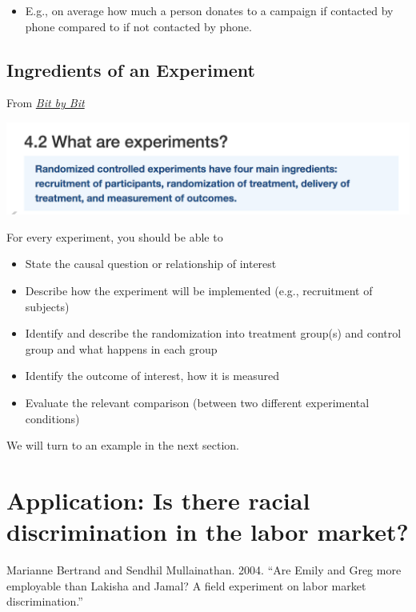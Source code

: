 \documentclass[
  letterpaper,
  DIV=11,
  numbers=noendperiod]{scrreprt}
\providecommand{\tightlist}{%
  \setlength{\itemsep}{0pt}\setlength{\parskip}{0pt}}\usepackage{longtable,booktabs,array}
\begin{document}
\begin{itemize}
\tightlist
\item
  E.g., on average how much a person donates to a campaign if contacted
  by phone compared to if not contacted by phone.
\end{itemize}

\hypertarget{ingredients-of-an-experiment}{%
\subsection{Ingredients of an
Experiment}\label{ingredients-of-an-experiment}}

From
\href{https://www.bitbybitbook.com/en/1st-ed/running-experiments/}{\emph{Bit
by Bit}}

\includegraphics{images/bitbybitexp.png}

For every experiment, you should be able to

\begin{itemize}
\tightlist
\item
  State the causal question or relationship of interest
\item
  Describe how the experiment will be implemented (e.g., recruitment of
  subjects)
\item
  Identify and describe the randomization into treatment group(s) and
  control group and what happens in each group
\item
  Identify the outcome of interest, how it is measured
\item
  Evaluate the relevant comparison (between two different experimental
  conditions)
\end{itemize}

We will turn to an example in the next section.

\hypertarget{application-is-there-racial-discrimination-in-the-labor-market}{%
\section{Application: Is there racial discrimination in the labor
market?}\label{application-is-there-racial-discrimination-in-the-labor-market}}

Marianne Bertrand and Sendhil Mullainathan. 2004. ``Are Emily and Greg
more employable than Lakisha and Jamal? A field experiment on labor
market discrimination.''
\end{document}
